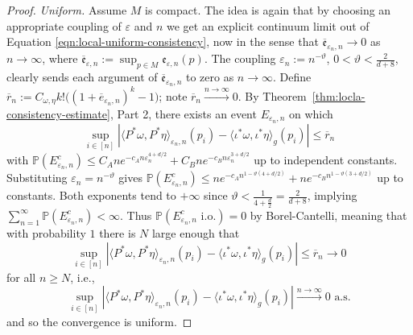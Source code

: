 \documentclass{article}
\theoremstyle{remark}
\newtheorem{remark}{Remark}
\theoremstyle{plain}
\begin{document}
\begin{proof}
\textit{Uniform.} Assume $M$ is compact. The idea is again that by choosing an appropriate coupling of $\varepsilon$ and $n$ we get an explicit continuum limit out of Equation \ref{eqn:local-uniform-consistency}, now in the sense that $\overline{\mathfrak{e}}_{\varepsilon_{n}, n} \to 0$ as $n \to \infty$, where $\overline{\mathfrak{e}}_{\varepsilon,n}:=\sup_{p \in M}\mathfrak{e}_{\varepsilon,n}(p)$. The coupling $\varepsilon_{n}:=n^{-\vartheta}$, $0<\vartheta< \frac{2}{d+8}$, clearly sends each argument of $\overline{\mathfrak{e}}_{\varepsilon_{n}, n}$ to zero as $n\to \infty$. Define $\overline{r}_{n}:=C_{\omega, \eta}k!\big( (1 + \overline{e}_{\varepsilon_{n}, n})^{k}-1 \big)$; note $\overline{r}_{n} \xrightarrow{n \to \infty}0$. By Theorem~\ref{thm:locla-consistency-estimate}, Part 2, there exists an event $E_{\varepsilon_{n},n}$ on which
$$\sup_{i \in [n]}|\langle P^{*}\omega, P^{*}\eta \rangle_{\varepsilon_{n},n}(p_{i}) -\langle \iota^{*}\omega, \iota^{*}\eta \rangle_{g}(p_{i}) |
\leq \overline{r}_{n}$$
with $\mathbb{P}(E_{\varepsilon_{n}, n}^{c})\leq C_{A}n e^{-c_{A}n \varepsilon_{n}^{4+d/2}}+C_{B}n e^{-c_{B}n \varepsilon_{n}^{3+d/2}}$ up to independent constants. Substituting $\varepsilon_{n}=n^{- \vartheta}$ gives $\mathbb{P}(E_{\varepsilon_{n}, n}^{c}) \leq ne^{-c_{A}n^{1-\vartheta(4+d/2)}}+ne^{-c_{B}n^{1 - \vartheta(3+d/2)}}$ up to constants. Both exponents tend to $+\infty$ since $\vartheta< \frac{1}{4+\frac{d}{2}}=\frac{2}{d+8}$, implying $\sum_{n=1}^{\infty}\mathbb{P}(E_{\varepsilon_{n},n}^{c})<\infty$. Thus $\mathbb{P}(E_{\varepsilon_{n}, n}^{c} \text{ i.o.})=0$ by Borel-Cantelli, meaning that with probability $1$ there is $N$ large enough that
$$\sup_{i \in [n]}|\langle P^{*}\omega, P^{*}\eta \rangle_{\varepsilon_{n},n}(p_{i}) -\langle \iota^{*}\omega, \iota^{*}\eta \rangle_{g}(p_{i}) |
\leq \overline{r}_{n} \to 0$$
for all $n \geq N$, i.e.,
$$\sup_{i \in [n]}|\langle P^{*}\omega, P^{*}\eta \rangle_{\varepsilon_{n},n}(p_{i}) -\langle \iota^{*}\omega, \iota^{*}\eta \rangle_{g}(p_{i}) |
\xrightarrow{n \to \infty} 0 \text{ a.s.}$$
and so the convergence is uniform.




\end{proof}
\end{document}
